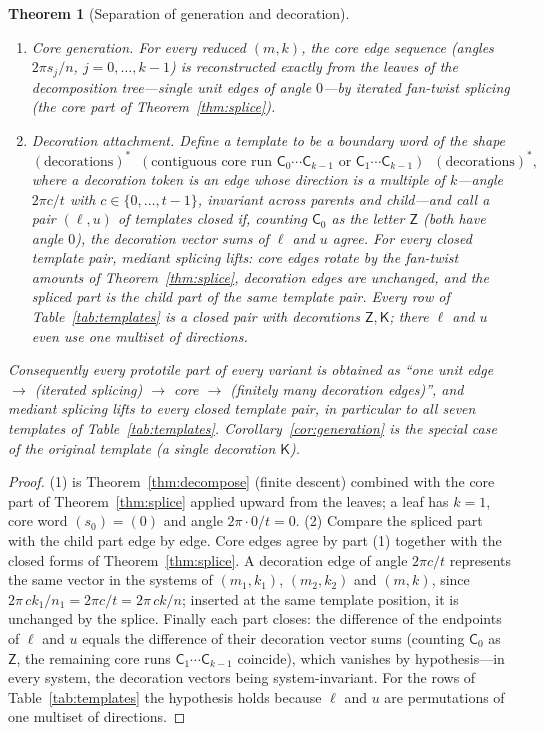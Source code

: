 \documentclass[11pt]{article}
\newtheorem{theorem}{Theorem}[section]
\theoremstyle{remark}
\theoremstyle{definition}
\newcommand{\core}{\mathsf{C}}
\newcommand{\Zt}{\mathsf{Z}}
\newcommand{\Kt}{\mathsf{K}}
\begin{document}
\begin{theorem}[Separation of generation and decoration]\label{thm:separation}
\leavevmode
\begin{enumerate}
\item[\emph{(1)}] \emph{Core generation.} For every reduced $(m,k)$, the core edge
sequence (angles $2\pi s_j/n$, $j=0,\dots,k-1$) is reconstructed exactly from the leaves
of the decomposition tree---single unit edges of angle $0$---by iterated fan-twist
splicing (the core part of Theorem~\ref{thm:splice}).
\item[\emph{(2)}] \emph{Decoration attachment.} Define a \emph{template} to be a
boundary word of the shape
\[
(\text{decorations})^*\;\;
(\text{contiguous core run }\core_0\cdots\core_{k-1}\text{ or }\core_1\cdots\core_{k-1})
\;\;(\text{decorations})^*,
\]
where a
\emph{decoration token} is an edge whose direction is a multiple of $k$---angle
$2\pi c/t$ with $c\in\{0,\dots,t-1\}$, invariant across parents and child---and call a
pair $(\ell,u)$ of templates \emph{closed} if, counting $\core_0$ as the letter $\Zt$
(both have angle $0$), the decoration vector sums of $\ell$ and $u$ agree. For every
closed template pair, mediant splicing lifts: core edges rotate by the fan-twist
amounts of Theorem~\ref{thm:splice}, decoration edges are unchanged, and the spliced
part is the child part of the same template pair. Every row of
Table~\ref{tab:templates} is a closed pair with decorations $\Zt,\Kt$; there $\ell$
and $u$ even use one multiset of directions.
\end{enumerate}
Consequently every prototile part of every variant is obtained as ``one unit edge
$\to$ (iterated splicing) $\to$ core $\to$ (finitely many decoration edges)'', and
mediant splicing lifts to every closed template pair, in particular to all seven
templates of Table~\ref{tab:templates}. Corollary~\ref{cor:generation} is the
special case of the original template (a single decoration $\Kt$).
\end{theorem}

\begin{proof}
(1) is Theorem~\ref{thm:decompose} (finite descent) combined with the core part of
Theorem~\ref{thm:splice} applied upward from the leaves; a leaf has $k=1$, core word
$(s_0)=(0)$ and angle $2\pi\cdot 0/t=0$.
(2) Compare the spliced part with the child part edge by edge. Core edges agree by
part (1) together with the closed forms of Theorem~\ref{thm:splice}. A decoration edge
of angle $2\pi c/t$ represents the same vector in the systems of $(m_1,k_1)$,
$(m_2,k_2)$ and $(m,k)$, since $2\pi\,ck_1/n_1=2\pi c/t=2\pi\,ck/n$; inserted at the
same template position, it is unchanged by the splice. Finally each part closes: the
difference of the endpoints of $\ell$ and $u$ equals the difference of their decoration
vector sums (counting $\core_0$ as $\Zt$, the remaining core runs
$\core_1\cdots\core_{k-1}$ coincide), which vanishes by hypothesis---in every system,
the decoration vectors being system-invariant. For the rows of
Table~\ref{tab:templates} the hypothesis holds because $\ell$ and $u$ are permutations
of one multiset of directions.
\end{proof}
\end{document}

